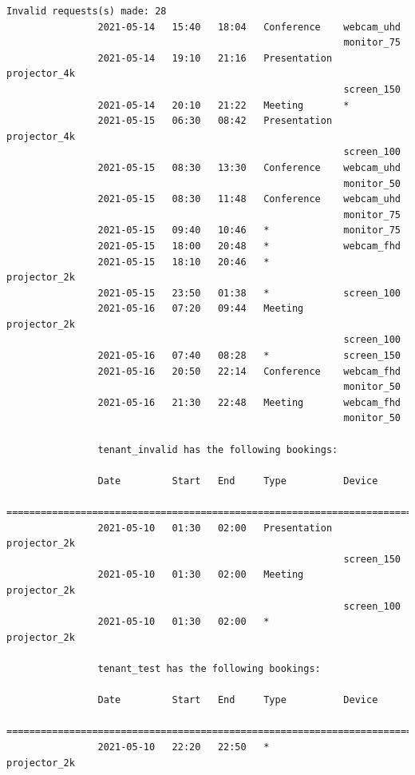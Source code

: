 \documentclass{article}
\begin{document}
\begin{Verbatim}[gobble=8]
                    Invalid requests(s) made: 28
                2021-05-14   15:40   18:04   Conference    webcam_uhd
                                                           monitor_75
                2021-05-14   19:10   21:16   Presentation  projector_4k
                                                           screen_150
                2021-05-14   20:10   21:22   Meeting       *
                2021-05-15   06:30   08:42   Presentation  projector_4k
                                                           screen_100
                2021-05-15   08:30   13:30   Conference    webcam_uhd
                                                           monitor_50
                2021-05-15   08:30   11:48   Conference    webcam_uhd
                                                           monitor_75
                2021-05-15   09:40   10:46   *             monitor_75
                2021-05-15   18:00   20:48   *             webcam_fhd
                2021-05-15   18:10   20:46   *             projector_2k
                2021-05-15   23:50   01:38   *             screen_100
                2021-05-16   07:20   09:44   Meeting       projector_2k
                                                           screen_100
                2021-05-16   07:40   08:28   *             screen_150
                2021-05-16   20:50   22:14   Conference    webcam_fhd
                                                           monitor_50
                2021-05-16   21:30   22:48   Meeting       webcam_fhd
                                                           monitor_50
                
                tenant_invalid has the following bookings:
                
                Date         Start   End     Type          Device
                ===========================================================================
                2021-05-10   01:30   02:00   Presentation  projector_2k
                                                           screen_150
                2021-05-10   01:30   02:00   Meeting       projector_2k
                                                           screen_100
                2021-05-10   01:30   02:00   *             projector_2k
                
                tenant_test has the following bookings:
                
                Date         Start   End     Type          Device
                ===========================================================================
                2021-05-10   22:20   22:50   *             projector_2k
                

\end{Verbatim}
\end{document}
